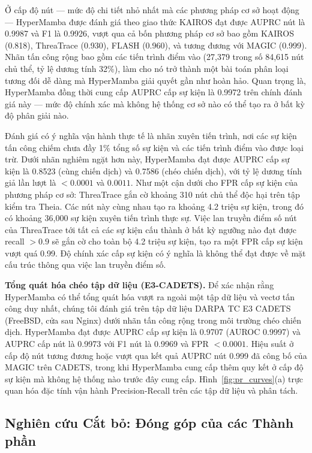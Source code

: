 \documentclass[letterpaper,twocolumn,10pt]{article}
\begin{document}
Ở cấp độ nút --- mức độ chi tiết nhỏ nhất mà các phương pháp cơ sở hoạt động --- HyperMamba được đánh giá theo giao thức KAIROS đạt được AUPRC nút là 0.9987 và F1 là 0.9926, vượt qua cả bốn phương pháp cơ sở bao gồm KAIROS (0.818), ThreaTrace (0.930), FLASH (0.960), và tương đương với MAGIC (0.999). Nhãn tấn công rộng bao gồm các tiến trình điểm vào (27,379 trong số 84,615 nút chủ thể, tỷ lệ dương tính 32\%), làm cho nó trở thành một bài toán phân loại tương đối dễ dàng mà HyperMamba giải quyết gần như hoàn hảo. Quan trọng là, HyperMamba đồng thời cung cấp AUPRC cấp sự kiện là 0.9972 trên chính đánh giá này --- mức độ chính xác mà không hệ thống cơ sở nào có thể tạo ra ở bất kỳ độ phân giải nào.

Đánh giá có ý nghĩa vận hành thực tế là nhãn xuyên tiến trình, nơi các sự kiện tấn công chiếm chưa đầy 1\% tổng số sự kiện và các tiến trình điểm vào được loại trừ. Dưới nhãn nghiêm ngặt hơn này, HyperMamba đạt được AUPRC cấp sự kiện là 0.8523 (cùng chiến dịch) và 0.7586 (chéo chiến dịch), với tỷ lệ dương tính giả lần lượt là $<0.0001$ và $0.0011$. Như một cận dưới cho FPR cấp sự kiện của phương pháp cơ sở: ThreaTrace gắn cờ khoảng 310 nút chủ thể độc hại trên tập kiểm tra Theia. Các nút này cùng nhau tạo ra khoảng 4.2 triệu sự kiện, trong đó có khoảng 36,000 sự kiện xuyên tiến trình thực sự. Việc lan truyền điểm số nút của ThreaTrace tới tất cả các sự kiện cấu thành ở bất kỳ ngưỡng nào đạt được recall $>0.9$ sẽ gắn cờ cho toàn bộ 4.2 triệu sự kiện, tạo ra một FPR cấp sự kiện vượt quá 0.99. Độ chính xác cấp sự kiện có ý nghĩa là không thể đạt được về mặt cấu trúc thông qua việc lan truyền điểm số.

\textbf{Tổng quát hóa chéo tập dữ liệu (E3-CADETS).} Để xác nhận rằng HyperMamba có thể tổng quát hóa vượt ra ngoài một tập dữ liệu và vectơ tấn công duy nhất, chúng tôi đánh giá trên tập dữ liệu DARPA TC E3 CADETS (FreeBSD, cửa sau Nginx) dưới nhãn tấn công rộng trong môi trường chéo chiến dịch. HyperMamba đạt được AUPRC cấp sự kiện là 0.9707 (AUROC 0.9997) và AUPRC cấp nút là 0.9973 với F1 nút là 0.9969 và FPR $<0.0001$. Hiệu suất ở cấp độ nút tương đương hoặc vượt qua kết quả AUPRC nút 0.999 đã công bố của MAGIC trên CADETS, trong khi HyperMamba cung cấp thêm quy kết ở cấp độ sự kiện mà không hệ thống nào trước đây cung cấp. Hình~\ref{fig:pr_curves}(a) trực quan hóa đặc tính vận hành Precision-Recall trên các tập dữ liệu và phân tách.



\subsection{Nghiên cứu Cắt bỏ: Đóng góp của các Thành phần}
\label{sec:ablation}
\end{document}
